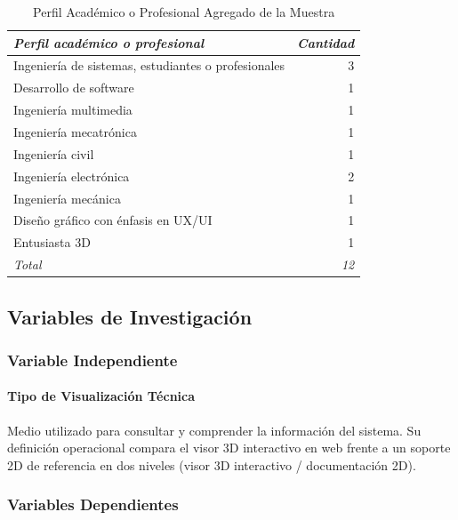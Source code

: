 \begin{table}[htbp]
    \caption{Perfil Académico o Profesional Agregado de la Muestra}
    \label{tab:perfil_agregado_participantes}
    \begin{tabularx}{\textwidth}{Xr}
        \hline
        \textit{Perfil académico o profesional} & \textit{Cantidad} \\ \hline
        Ingeniería de sistemas, estudiantes o profesionales & 3 \\
        Desarrollo de software & 1 \\
        Ingeniería multimedia & 1 \\
        Ingeniería mecatrónica & 1 \\
        Ingeniería civil & 1 \\
        Ingeniería electrónica & 2 \\
        Ingeniería mecánica & 1 \\
        Diseño gráfico con énfasis en UX/UI & 1 \\
        Entusiasta 3D & 1 \\ \hline
        \textit{Total} & \textit{12} \\ \hline
    \end{tabularx}
\end{table}

\subsection{Variables de Investigación}

\subsubsection{Variable Independiente}

\paragraph{Tipo de Visualización Técnica} Medio utilizado para consultar y comprender la información del sistema. Su definición operacional compara el visor 3D interactivo en web frente a un soporte 2D de referencia en dos niveles (visor 3D interactivo / documentación 2D).

\subsubsection{Variables Dependientes}

